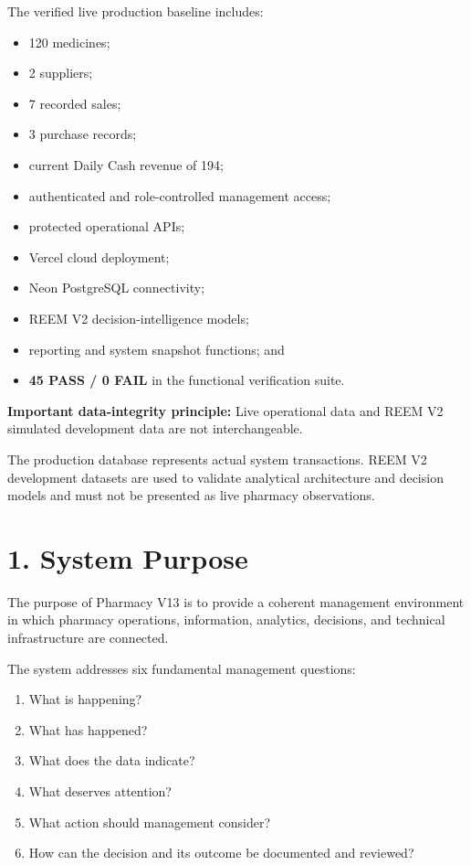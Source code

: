 \documentclass[12pt,a4paper]{article}
\begin{document}
The verified live production baseline includes:

\begin{itemize}[leftmargin=1cm]
\item 120 medicines;
\item 2 suppliers;
\item 7 recorded sales;
\item 3 purchase records;
\item current Daily Cash revenue of 194;
\item authenticated and role-controlled management access;
\item protected operational APIs;
\item Vercel cloud deployment;
\item Neon PostgreSQL connectivity;
\item REEM V2 decision-intelligence models;
\item reporting and system snapshot functions; and
\item \textbf{45 PASS / 0 FAIL} in the functional verification suite.
\end{itemize}

\begin{goldbox}
\textbf{Important data-integrity principle:}
Live operational data and REEM V2 simulated development data are not interchangeable.

The production database represents actual system transactions. REEM V2 development datasets are used to validate analytical architecture and decision models and must not be presented as live pharmacy observations.
\end{goldbox}

\section*{1. System Purpose}

The purpose of Pharmacy V13 is to provide a coherent management environment in which pharmacy operations, information, analytics, decisions, and technical infrastructure are connected.

The system addresses six fundamental management questions:

\begin{enumerate}[leftmargin=1cm]
\item What is happening?
\item What has happened?
\item What does the data indicate?
\item What deserves attention?
\item What action should management consider?
\item How can the decision and its outcome be documented and reviewed?
\end{enumerate}
\end{document}
